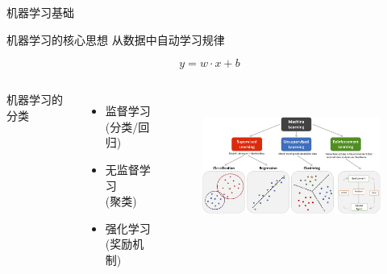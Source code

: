 \begin{frame}{机器学习基础}
  \begin{block}{机器学习的核心思想}
    从数据中自动学习规律
  \end{block}

  \begin{example}
    \begin{equation*}
      y = w \cdot x + b
    \end{equation*}
  \end{example}
  \begin{columns}
机器学习的分类
  \begin{itemize}
    \item 监督学习\\(分类/回归)
    \item 无监督学习\\(聚类)
    \item 强化学习\\(奖励机制)
  \end{itemize}
\begin{figure}[h!]
\vspace*{-0.45in}
\centering
   \includegraphics[height=1.6in, width=2.9in, viewport=0 0 210 120,clip]{Figures/The_main-types-of-machine-learning.png}
\label{Machine-Learning-types}
\end{figure}
  \end{columns}
\end{frame}

